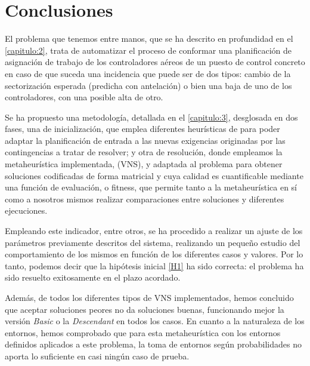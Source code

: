 \graphicspath{{capitulos/Capitulo6-Conclusiones/recursos/}}


\section{Conclusiones} \label{capitulo:6}

El problema que tenemos entre manos, que se ha descrito en profundidad en el \autoref{capitulo:2}, trata de automatizar el proceso de conformar una planificación de asignación de trabajo de los controladores aéreos de un puesto de control concreto en caso de que suceda una incidencia que puede ser de dos tipos: cambio de la sectorización esperada (predicha con antelación) o bien una baja de uno de los controladores, con una posible alta de otro.



Se ha propuesto una metodología, detallada en el \autoref{capitulo:3}, desglosada en dos fases, una de inicialización, que emplea diferentes heurísticas de para poder adaptar la planificación de entrada a las nuevas exigencias originadas por las contingencias a tratar de resolver; y otra de resolución, donde empleamos la metaheurística implementada, \vns{} (VNS),  y adaptada al problema para obtener soluciones codificadas de forma matricial y cuya calidad es cuantificable mediante una función de evaluación, o fitness, que permite tanto a la metaheurística en sí como a nosotros mismos realizar comparaciones entre soluciones y diferentes ejecuciones. 

Empleando este indicador, entre otros, se ha procedido a realizar un ajuste de los parámetros previamente descritos del sistema, realizando un pequeño estudio del comportamiento de los mismos en función de los diferentes casos y valores. Por lo tanto, podemos decir que la hipótesis inicial \ref{H1} ha sido correcta: el problema ha sido resuelto exitosamente en el plazo acordado.

Además, de todos los diferentes tipos de VNS implementados, hemos concluido que aceptar soluciones peores no da soluciones buenas, funcionando mejor la versión \textit{Basic} o la \textit{Descendant} en todos los casos. En cuanto a la naturaleza de los entornos, hemos comprobado que para esta metaheurística con los entornos definidos aplicados a este problema, la toma de entornos según probabilidades no aporta lo suficiente en casi ningún caso de prueba.

